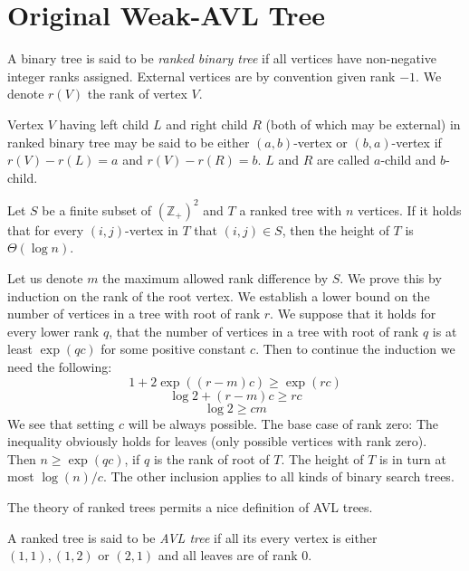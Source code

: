 

\section{Original Weak-AVL Tree}

\begin{defn}
A binary tree is said to be {\em ranked binary tree} if all vertices have non-negative integer ranks assigned. External vertices are by convention given rank $-1$. We denote $r(V)$ the rank of vertex $V$.
\end{defn}

\begin{defn}
Vertex $V$ having left child $L$ and right child $R$ (both of which may be external) in ranked binary tree may be said to be either $(a,b)$-vertex or $(b,a)$-vertex if $r(V) - r(L) = a$ and $r(V) - r(R) = b$. $L$ and $R$ are called $a$-child and $b$-child.
\end{defn}

\begin{prop}
Let $S$ be a finite subset of ${(\mathbb{Z} _ +)}^2$ and $T$ a ranked tree with $n$ vertices. If it holds that for every $(i,j)$-vertex in $T$ that $(i,j) \in S$, then the height of $T$ is $\Theta(\log n)$.
\label{thm-rbt-depth}
\end{prop}

\begin{myproof}
Let us denote $m$ the maximum allowed rank difference by $S$.
We prove this by induction on the rank of the root vertex. We establish a lower bound on the number of vertices in a tree with root of rank $r$. 
We suppose that it holds for every lower rank $q$, that the number of vertices in a tree with root of rank $q$ is at least $\exp(qc)$ for some positive constant $c$. 
Then to continue the induction we need the following: $$ 1 + 2\exp((r-m)c) \geq \exp(rc) $$ $$ \log 2 + (r-m)c \geq rc $$ $$ \log 2 \geq cm $$
We see that setting $c$ will be always possible.
The base case of rank zero: The inequality obviously holds for leaves (only possible vertices with rank zero).\\
Then $n \geq \exp(qc)$, if $q$ is the rank of root of $T$. The height of $T$ is in turn at most $ \log(n)/c $. 
The other inclusion applies to all kinds of binary search trees.
\end{myproof}

The theory of ranked trees permits a nice definition of AVL trees\cite{avl}.

\begin{defn}
A ranked tree is said to be {\em AVL tree} if all its every vertex is either $(1,1), (1,2)$ or $(2,1)$  and all leaves are of rank $0$.
\end{defn}

